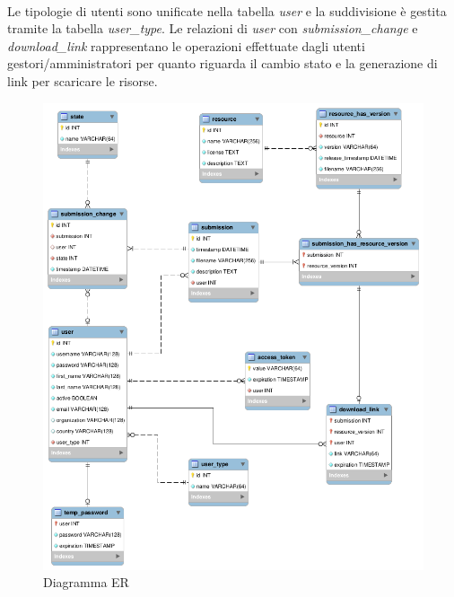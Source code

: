 \paragraph{}
Le tipologie di utenti sono unificate nella tabella \textit{user} e la
suddivisione è gestita tramite la tabella \textit{user\_type}. Le relazioni di
\textit{user} con \textit{submission\_change} e \textit{download\_link}
rappresentano le operazioni effettuate dagli utenti gestori/amministratori per
quanto riguarda il cambio stato e la generazione di link per scaricare le risorse.

\begin{figure}[ht]
	\centering
	\includegraphics[width=\textwidth]{assets/diagrams/db-er-diagram.png}
	\caption{Diagramma ER}
	\label{fig:er-diagram}
\end{figure}